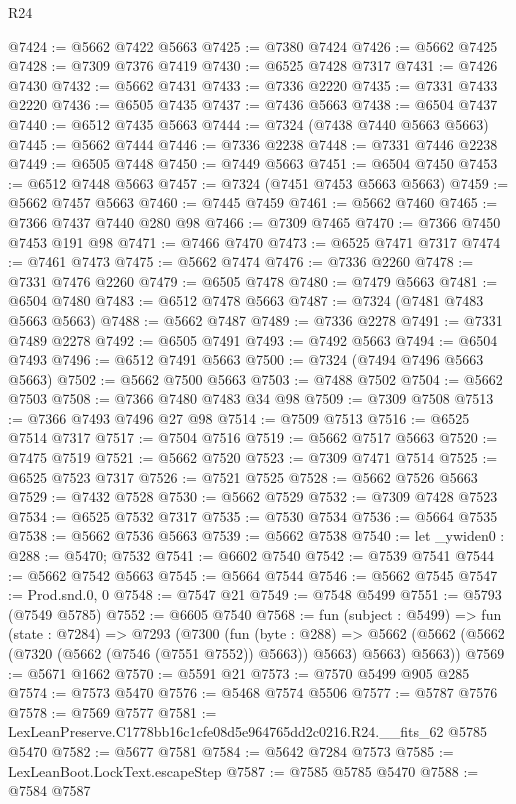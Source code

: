 \begin{lexlean}{R24}
\begin{coremodule}
@7424 := @5662 @7422 @5663
@7425 := @7380 @7424
@7426 := @5662 @7425
@7428 := @7309 @7376 @7419
@7430 := @6525 @7428 @7317
@7431 := @7426 @7430
@7432 := @5662 @7431
@7433 := @7336 @2220
@7435 := @7331 @7433 @2220
@7436 := @6505 @7435
@7437 := @7436 @5663
@7438 := @6504 @7437
@7440 := @6512 @7435 @5663
@7444 := @7324 (@7438 @7440 @5663 @5663)
@7445 := @5662 @7444
@7446 := @7336 @2238
@7448 := @7331 @7446 @2238
@7449 := @6505 @7448
@7450 := @7449 @5663
@7451 := @6504 @7450
@7453 := @6512 @7448 @5663
@7457 := @7324 (@7451 @7453 @5663 @5663)
@7459 := @5662 @7457 @5663
@7460 := @7445 @7459
@7461 := @5662 @7460
@7465 := @7366 @7437 @7440 @280 @98
@7466 := @7309 @7465
@7470 := @7366 @7450 @7453 @191 @98
@7471 := @7466 @7470
@7473 := @6525 @7471 @7317
@7474 := @7461 @7473
@7475 := @5662 @7474
@7476 := @7336 @2260
@7478 := @7331 @7476 @2260
@7479 := @6505 @7478
@7480 := @7479 @5663
@7481 := @6504 @7480
@7483 := @6512 @7478 @5663
@7487 := @7324 (@7481 @7483 @5663 @5663)
@7488 := @5662 @7487
@7489 := @7336 @2278
@7491 := @7331 @7489 @2278
@7492 := @6505 @7491
@7493 := @7492 @5663
@7494 := @6504 @7493
@7496 := @6512 @7491 @5663
@7500 := @7324 (@7494 @7496 @5663 @5663)
@7502 := @5662 @7500 @5663
@7503 := @7488 @7502
@7504 := @5662 @7503
@7508 := @7366 @7480 @7483 @34 @98
@7509 := @7309 @7508
@7513 := @7366 @7493 @7496 @27 @98
@7514 := @7509 @7513
@7516 := @6525 @7514 @7317
@7517 := @7504 @7516
@7519 := @5662 @7517 @5663
@7520 := @7475 @7519
@7521 := @5662 @7520
@7523 := @7309 @7471 @7514
@7525 := @6525 @7523 @7317
@7526 := @7521 @7525
@7528 := @5662 @7526 @5663
@7529 := @7432 @7528
@7530 := @5662 @7529
@7532 := @7309 @7428 @7523
@7534 := @6525 @7532 @7317
@7535 := @7530 @7534
@7536 := @5664 @7535
@7538 := @5662 @7536 @5663
@7539 := @5662 @7538
@7540 := let _ywiden0 : @288 := @5470; @7532
@7541 := @6602 @7540
@7542 := @7539 @7541
@7544 := @5662 @7542 @5663
@7545 := @5664 @7544
@7546 := @5662 @7545
@7547 := Prod.snd.{0, 0}
@7548 := @7547 @21
@7549 := @7548 @5499
@7551 := @5793 (@7549 @5785)
@7552 := @6605 @7540
@7568 := fun (subject : @5499) =>
  fun (state : @7284) =>
  @7293
    (@7300
      (fun (byte : @288) =>
      @5662 (@5662 (@5662 (@7320 (@5662 (@7546 (@7551 @7552)) @5663)) @5663) @5663) @5663))
@7569 := @5671 @1662
@7570 := @5591 @21
@7573 := @7570 @5499 @905 @285
@7574 := @7573 @5470
@7576 := @5468 @7574 @5506
@7577 := @5787 @7576
@7578 := @7569 @7577
@7581 := LexLeanPreserve.C1778bb16c1cfe08d5e964765dd2c0216.R24.__fits_62 @5785 @5470
@7582 := @5677 @7581
@7584 := @5642 @7284 @7573
@7585 := LexLeanBoot.LockText.escapeStep
@7587 := @7585 @5785 @5470
@7588 := @7584 @7587

\end{coremodule}
\end{lexlean}
